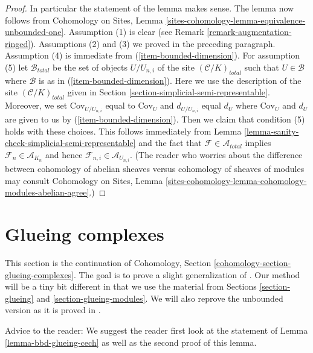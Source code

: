 \begin{proof}
\medskip\noindent
In particular the statement of the lemma makes sense.
The lemma now follows from Cohomology on Sites,
Lemma \ref{sites-cohomology-lemma-equivalence-unbounded-one}.
Assumption (1) is clear (see Remark \ref{remark-augmentation-ringed}).
Assumptions (2) and (3) we proved in the preceding paragraph.
Assumption (4) is immediate from (\ref{item-bounded-dimension}).
For assumption (5) let $\mathcal{B}_{total}$ be the set of
objects $U/U_{n, i}$ of the site $(\mathcal{C}/K)_{total}$
such that $U \in \mathcal{B}$ where $\mathcal{B}$ is as in
(\ref{item-bounded-dimension}). Here we use the description of
the site $(\mathcal{C}/K)_{total}$ given in
Section \ref{section-simplicial-semi-representable}.
Moreover, we set $\text{Cov}_{U/U_{n, i}}$ equal to $\text{Cov}_U$
and $d_{U/U_{n, i}}$ equal $d_U$ where $\text{Cov}_U$ and $d_U$
are given to us by (\ref{item-bounded-dimension}).
Then we claim that condition (5) holds with these choices.
This follows immediately from
Lemma \ref{lemma-sanity-check-simplicial-semi-representable}
and the fact that $\mathcal{F} \in \mathcal{A}_{total}$
implies $\mathcal{F}_n \in \mathcal{A}_{K_n}$ and hence
$\mathcal{F}_{n, i} \in \mathcal{A}_{U_{n, i}}$.
(The reader who worries about the difference between
cohomology of abelian sheaves versus cohomology
of sheaves of modules may consult Cohomology on Sites, Lemma
\ref{sites-cohomology-lemma-cohomology-modules-abelian-agree}.)
\end{proof}










\section{Glueing complexes}
\label{section-glueing-complexes}

\noindent
This section is the continuation of
Cohomology, Section \ref{cohomology-section-glueing-complexes}.
The goal is to prove a slight generalization of \cite[Theorem 3.2.4]{BBD}.
Our method will be a tiny bit different in that we use
the material from Sections \ref{section-glueing} and
\ref{section-glueing-modules}. We will also reprove the
unbounded version as it is proved in \cite{six-I}.

\medskip\noindent
Advice to the reader: We suggest the reader first look at the statement of
Lemma \ref{lemma-bbd-glueing-cech} as well as the second proof of this lemma.

